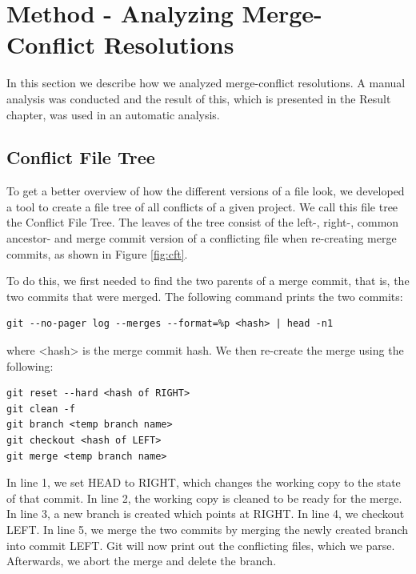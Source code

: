 \chapter{Method - Analyzing Merge-Conflict Resolutions}
In this section we describe how we analyzed merge-conflict resolutions. A manual analysis was conducted and the result of this, which is presented in the Result chapter, was used in an automatic analysis.
\section{Conflict File Tree}\label{sec:cft}
To get a better overview of how the different versions of a file look, we developed a tool to create a file tree of all conflicts of a given project. We call this file tree the Conflict File Tree. The leaves of the tree consist of the left-, right-, common ancestor- and merge commit version of a conflicting file when re-creating merge commits, as shown in Figure \ref{fig:cft}.

To do this, we first needed to find the two parents of a merge commit, that is, the two commits that were merged. The following command prints the two commits:
\lstset{language=Bash,numbers=left,xleftmargin=2em,frame=single,framexleftmargin=1.5em}
\begin{lstlisting}[frame=single,breaklines=true,tabsize=2]
git --no-pager log --merges --format=%p <hash> | head -n1
\end{lstlisting}
where <hash> is the merge commit hash. We then re-create the merge using the following:
\lstset{language=Bash,numbers=left,xleftmargin=2em,frame=single,framexleftmargin=1.5em}
\begin{lstlisting}[frame=single,breaklines=true,tabsize=2]
git reset --hard <hash of RIGHT>
git clean -f
git branch <temp branch name>
git checkout <hash of LEFT>
git merge <temp branch name>
\end{lstlisting}
In line 1, we set HEAD to RIGHT, which changes the working copy to the state of that commit. In line 2,  the working copy is cleaned to be ready for the merge. In line 3, a new branch is created which points at RIGHT. In line 4, we checkout LEFT. In line 5, we merge the two commits by merging the newly created branch into commit LEFT. Git will now print out the conflicting files, which we parse. Afterwards, we abort the merge and delete the branch.

